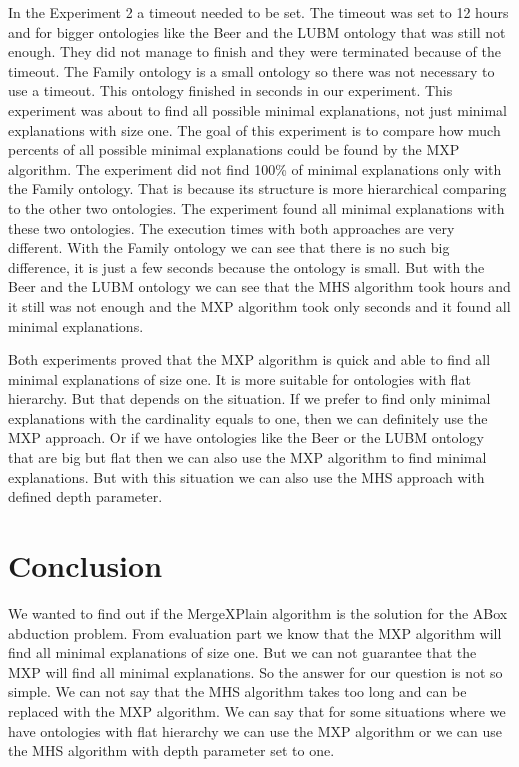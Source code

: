\documentclass[12pt,a4paper]{article}
\begin{document}
In the Experiment 2 a timeout needed to be set. The timeout was set to 12 hours and for bigger ontologies like the Beer and the LUBM ontology that was still not enough. They did not manage to finish and they were terminated because of the timeout. The Family ontology is a small ontology so there was not necessary to use a timeout. This ontology finished in seconds in our experiment. This experiment was about to find all possible minimal explanations, not just minimal explanations with size one. The goal of this experiment is to compare how much percents of all possible minimal explanations could be found by the MXP algorithm. The experiment did not find 100\% of minimal explanations only with the Family ontology. That is because its structure is more hierarchical comparing to the other two ontologies. The experiment found all minimal explanations with these two ontologies. The execution times with both approaches are very different. With the Family ontology we can see that there is no such big difference, it is just a few seconds because the ontology is small. But with the Beer and the LUBM ontology we can see that the MHS algorithm took hours and it still was not enough and the MXP algorithm took only seconds and it found all minimal explanations.

Both experiments proved that the MXP algorithm is quick and able to find all minimal explanations of size one. It is more suitable for ontologies with flat hierarchy. But that depends on the situation. If we prefer to find only minimal explanations with the cardinality equals to one, then we can definitely use the MXP approach. Or if we have ontologies like the Beer or the LUBM ontology that are big but flat then we can also use the MXP algorithm to find minimal explanations. But with this situation we can also use the MHS approach with defined depth parameter.

\pagebreak
\section*{Conclusion}
We wanted to find out if the MergeXPlain algorithm is the solution for the ABox abduction problem. From evaluation part we know that the MXP algorithm will find all minimal explanations of size one. But we can not guarantee that the MXP will find all minimal explanations. So the answer for our question is not so simple. We can not say that the MHS algorithm takes too long and can be replaced with the MXP algorithm. We can say that for some situations where we have ontologies with flat hierarchy we can use the MXP algorithm or we can use the MHS algorithm with depth parameter set to one.
\end{document}
